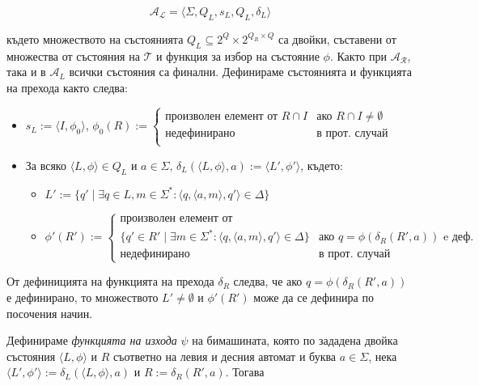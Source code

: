 \documentclass[12pt, oneside]{article}
\theoremstyle{definition}
\begin{document}
\[ \mathcal{A_L} = \langle \Sigma, Q_L, s_L, Q_L, \delta_L \rangle \]

където множеството на състоянията \( Q_L \subseteq 2^Q \times 2^{Q_R \times Q} \) са двойки, съставени от множества от състояния на \(\mathcal{T}\) и функция за избор на състояние \(\phi\). Както при \(\mathcal{A_R}\), така и в \(\mathcal{A}_L\) всички състояния са финални. Дефинираме състоянията и функцията на прехода както следва:

\begin{itemize}
	\item \( s_L := \langle I, \phi_0 \rangle \), \( \phi_0(R) :=  
	\begin{cases} 
		\text{произволен елемент от } R \cap I & \text{ако } R \cap I \neq \emptyset \\
		\text{недефинирано} & \text{в прот. случай} \\
	\end{cases} \)
	\item За всяко \( \langle L, \phi \rangle \in Q_L \text{ и } a \in \Sigma \text{, } \delta_L(\langle L, \phi \rangle, a) := \langle L', \phi' \rangle \), където:
	\begin{itemize}
		\item \( L' := \{ q' \mid \exists q \in L, m \in \Sigma^* : \langle q, \langle a, m \rangle, q' \rangle \in \Delta \} \)
		\item \( \phi'(R') := 
		\begin{cases}
			\text{произволен елемент от } \\
			\{ q' \in R' \mid \exists m \in \Sigma^* : \langle q, \langle a, m \rangle, q' \rangle \in \Delta \} & \text{ако } q = \phi(\delta_R(R', a)) \text{ e деф.} \\
			\text{недефинирано} & \text{в прот. случай}
		\end{cases} \)
	\end{itemize}
\end{itemize}

От дефиницията на функцията на прехода \( \delta_R \) следва, че ако \( q = \phi(\delta_R(R', a)) \) е дефинирано, то множеството \( L' \neq \emptyset \) и \( \phi'(R') \) може да се дефинира по посочения начин.

Дефинираме \emph{функцията на изхода} \(\psi\) на бимашината, която по зададена двойка състояния \(\langle L, \phi \rangle\) и \(R\) съответно на левия и десния автомат и буква \( a \in \Sigma \), нека \( \langle L', \phi' \rangle := \delta_L(\langle L, \phi \rangle, a) \) и \( R := \delta_R(R', a) \). Тогава
\end{document}
